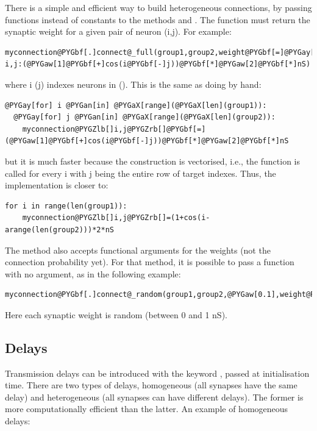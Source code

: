 \documentclass[letterpaper,10pt,english]{manual}
\begin{document}
There is a simple and efficient way to build heterogeneous connections, by passing functions
instead of constants to the methods  and .
The function must return the synaptic weight for a given pair of neuron (i,j).
For example:

\begin{Verbatim}[commandchars=@\[\]]
myconnection@PYGbf[.]connect@_full(group1,group2,weight@PYGbf[=]@PYGay[lambda] i,j:(@PYGaw[1]@PYGbf[+]cos(i@PYGbf[-]j))@PYGbf[*]@PYGaw[2]@PYGbf[*]nS)
\end{Verbatim}

where i (j) indexes neurons in  (). This is the same as doing by hand:

\begin{Verbatim}[commandchars=@\[\]]
@PYGay[for] i @PYGan[in] @PYGaX[range](@PYGaX[len](group1)):
  @PYGay[for] j @PYGan[in] @PYGaX[range](@PYGaX[len](group2)):
    myconnection@PYGZlb[]i,j@PYGZrb[]@PYGbf[=](@PYGaw[1]@PYGbf[+]cos(i@PYGbf[-]j))@PYGbf[*]@PYGaw[2]@PYGbf[*]nS
\end{Verbatim}

but it is much faster because the construction is vectorised, i.e., the function is called for every i
with j being the entire row of target indexes. Thus, the implementation is closer to:

\begin{Verbatim}[commandchars=@\[\]]
for i in range(len(group1)):
    myconnection@PYGZlb[]i,j@PYGZrb[]=(1+cos(i-arange(len(group2)))*2*nS
\end{Verbatim}

The method  also accepts functional arguments for the
weights (not the connection probability yet). For that method, it is possible to pass a function
with no argument, as in the following example:

\begin{Verbatim}[commandchars=@\[\]]
myconnection@PYGbf[.]connect@_random(group1,group2,@PYGaw[0.1],weight@PYGbf[=]@PYGay[lambda]:rand()@PYGbf[*]nS)
\end{Verbatim}

Here each synaptic weight is random (between 0 and 1 nS).


\subsection{Delays}

Transmission delays can be introduced with the keyword , passed at initialisation time.
There are two types of delays, homogeneous (all synapses have the same delay) and heterogeneous
(all synapses can have different delays). The former is more computationally efficient than the
latter. An example of homogeneous delays:
\end{document}
